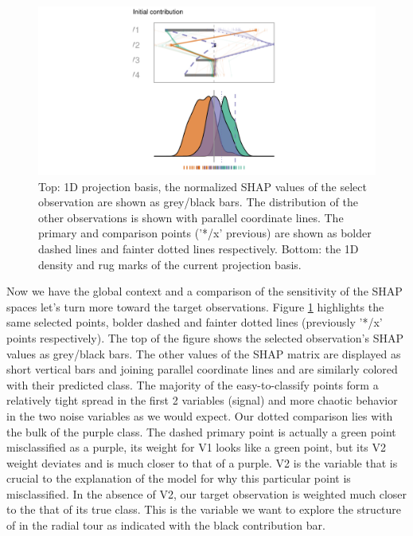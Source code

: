 \documentclass{template/monashthesis}
\begin{document}
\begin{figure}

{\centering \includegraphics[width=1\linewidth,]{./figures_from_script/ch5_fig3_cheem_initial_bas} 

}

\caption{Top: 1D projection basis, the normalized SHAP values of the select observation are shown as grey/black bars. The distribution of the other observations is shown with parallel coordinate lines. The primary and comparison points ('*/x' previous) are shown as bolder dashed lines and fainter dotted lines respectively. Bottom: the 1D density and rug marks of the current projection basis.}\label{fig:ch5fig3}
\end{figure}

Now we have the global context and a comparison of the sensitivity of the SHAP spaces let's turn more toward the target observations. Figure \ref{fig:ch5fig3} highlights the same selected points, bolder dashed and fainter dotted lines (previously '*/x' points respectively). The top of the figure shows the selected observation's SHAP values as grey/black bars. The other values of the SHAP matrix are displayed as short vertical bars and joining parallel coordinate lines and are similarly colored with their predicted class. The majority of the easy-to-classify points form a relatively tight spread in the first 2 variables (signal) and more chaotic behavior in the two noise variables as we would expect. Our dotted comparison lies with the bulk of the purple class. The dashed primary point is actually a green point misclassified as a purple, its weight for V1 looks like a green point, but its V2 weight deviates and is much closer to that of a purple. V2 is the variable that is crucial to the explanation of the model for why this particular point is misclassified. In the absence of V2, our target observation is weighted much closer to the that of its true class. This is the variable we want to explore the structure of in the radial tour as indicated with the black contribution bar.
\end{document}
